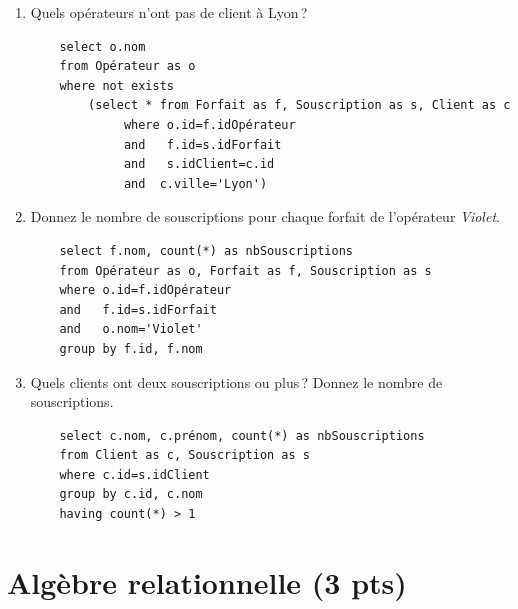\begin{enumerate}
\begin{solution}
	\begin{verbatim}
	select c.nom, c.prenom
	from Client as c
	where not exists
	    (select * from Souscription as s
	         where c.id = s.idClient)
	\end{verbatim}
\end{solution}

\item Quels opérateurs n'ont pas de client à Lyon\,?


\begin{solution}
	\begin{verbatim}
	select o.nom
	from Opérateur as o
	where not exists
	    (select * from Forfait as f, Souscription as s, Client as c
	         where o.id=f.idOpérateur
	         and   f.id=s.idForfait
	         and   s.idClient=c.id
	         and  c.ville='Lyon')
	\end{verbatim}
\end{solution}

\item Donnez le nombre de souscriptions pour chaque forfait de l'opérateur \emph{Violet}.

\begin{solution}
	\begin{verbatim}
	select f.nom, count(*) as nbSouscriptions
	from Opérateur as o, Forfait as f, Souscription as s
	where o.id=f.idOpérateur
	and   f.id=s.idForfait
	and   o.nom='Violet'
	group by f.id, f.nom
	\end{verbatim}
\end{solution}


\item Quels clients ont deux souscriptions  ou plus\,? Donnez le nombre de souscriptions.

\begin{solution}
	\begin{verbatim}
	select c.nom, c.prénom, count(*) as nbSouscriptions
	from Client as c, Souscription as s
	where c.id=s.idClient
	group by c.id, c.nom
	having count(*) > 1
	\end{verbatim}
\end{solution}

\end{enumerate}

\section{Algèbre relationnelle (3 pts)}

